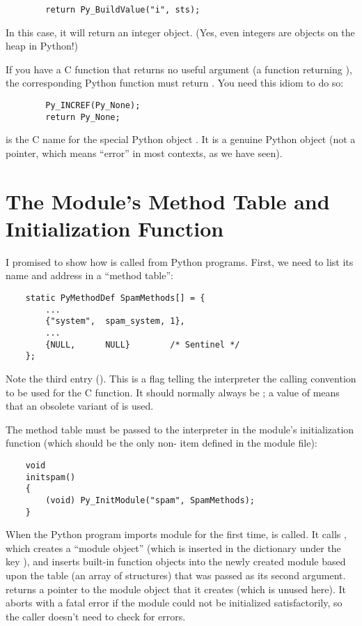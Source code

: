 \begin{verbatim}
        return Py_BuildValue("i", sts);
\end{verbatim}

In this case, it will return an integer object.  (Yes, even integers
are objects on the heap in Python!)

If you have a C function that returns no useful argument (a function
returning ), the corresponding Python function must return
.   You need this idiom to do so:

\begin{verbatim}
        Py_INCREF(Py_None);
        return Py_None;
\end{verbatim}

 is the C name for the special Python object
.  It is a genuine Python object (not a 
pointer, which means ``error'' in most contexts, as we have seen).


\section{The Module's Method Table and Initialization Function}

I promised to show how  is called from Python
programs.  First, we need to list its name and address in a ``method
table'':

\begin{verbatim}
    static PyMethodDef SpamMethods[] = {
        ...
        {"system",  spam_system, 1},
        ...
        {NULL,      NULL}        /* Sentinel */
    };
\end{verbatim}

Note the third entry ().  This is a flag telling the
interpreter the calling convention to be used for the C function.  It
should normally always be ; a value of  means that an
obsolete variant of  is used.

The method table must be passed to the interpreter in the module's
initialization function (which should be the only non-
item defined in the module file):

\begin{verbatim}
    void
    initspam()
    {
        (void) Py_InitModule("spam", SpamMethods);
    }
\end{verbatim}

When the Python program imports module  for the first time,
 is called.  It calls , which
creates a ``module object'' (which is inserted in the dictionary
 under the key ), and inserts built-in
function objects into the newly created module based upon the table
(an array of  structures) that was passed as its
second argument.   returns a pointer to the
module object that it creates (which is unused here).  It aborts with
a fatal error if the module could not be initialized satisfactorily,
so the caller doesn't need to check for errors.


